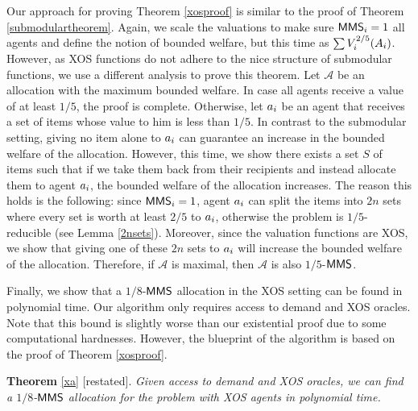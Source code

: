 Our approach for proving Theorem \ref{xosproof} is similar to the proof of Theorem \ref{submodulartheorem}. Again, we scale the valuations to make sure $\mathsf{MMS}_i = 1$ all agents and define the notion of bounded welfare, but this time as $\sum V_i^{2/5}(A_i)$. However, as XOS functions do not adhere to the nice structure of submodular functions, we use a different analysis to prove this theorem. Let $\mathcal{A}$ be an allocation with the maximum bounded welfare. In case all agents receive a value of at least $1/5$, the proof is complete. Otherwise, let $a_i$ be an agent that receives a set of items whose value to him is less than $1/5$. In contrast to the submodular setting, giving no item alone to $a_i$ can guarantee an increase in the bounded welfare of the allocation. However, this time, we show there exists a set $S$ of items such that if we take them back from their recipients and instead allocate them to agent $a_i$, the bounded welfare of the allocation increases. The reason this holds is the following: since $\mathsf{MMS}_i = 1$, agent $a_i$ can split the items into $2n$ sets where every set is worth at least $2/5$ to $a_i$, otherwise the problem is $1/5$-reducible (see Lemma \ref{2nsets}). Moreover, since the valuation functions are XOS, we show that giving one of these $2n$ sets to $a_i$ will increase the bounded welfare of the allocation. Therefore, if $\mathcal{A}$ is maximal, then $\mathcal{A}$ is also $1/5$-$\mathsf{MMS}$.

Finally, we show that a $1/8$-$\mathsf{MMS}$ allocation in the XOS setting can be found in polynomial time. Our algorithm only requires access to demand and XOS oracles. Note that this bound is slightly worse than our existential proof due to some computational hardnesses. However, the blueprint of the algorithm is based on the proof of Theorem \ref{xosproof}.

\vspace{0.2cm}
{\noindent \textbf{Theorem} \ref{xa} [restated]. \textit{ Given access to demand and XOS oracles, we can find a $1/8$-$\mathsf{MMS}$ allocation for the problem with XOS agents in polynomial time.
\\}}

